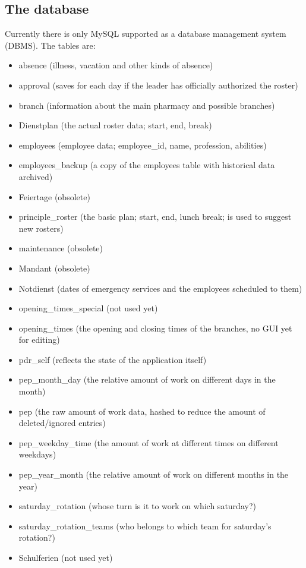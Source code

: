 \subsection{The database}
Currently there is only MySQL supported as a database management system (DBMS).
The tables are:
\begin{itemize}
\item absence (illness, vacation and other kinds of absence)
\item approval (saves for each day if the leader has officially authorized the roster)
\item branch (information about the main pharmacy and possible branches)
\item Dienstplan (the actual roster data; start, end, break)
\item employees (employee data; employee\_id, name, profession, abilities)
\item employees\_backup (a copy of the employees table with historical data archived)
\item Feiertage (obsolete)
\item principle\_roster (the basic plan; start, end, lunch break; is used to suggest new rosters)
\item maintenance (obsolete)
\item Mandant (obsolete)
\item Notdienst (dates of emergency services and the employees scheduled to them)
\item opening\_times\_special (not used yet)
\item opening\_times (the opening and closing times of the branches, no GUI yet for editing)
\item pdr\_self (reflects the state of the application itself)
\item pep\_month\_day (the relative amount of work on different days in the month)
\item pep (the raw amount of work data, hashed to reduce the amount of deleted/ignored entries)
\item pep\_weekday\_time (the amount of work at different times on different weekdays)
\item pep\_year\_month (the relative amount of work on different months in the year)
\item saturday\_rotation (whose turn is it to work on which saturday?)
\item saturday\_rotation\_teams (who belongs to which team for saturday's rotation?)
\item Schulferien (not used yet)

\end{itemize}
